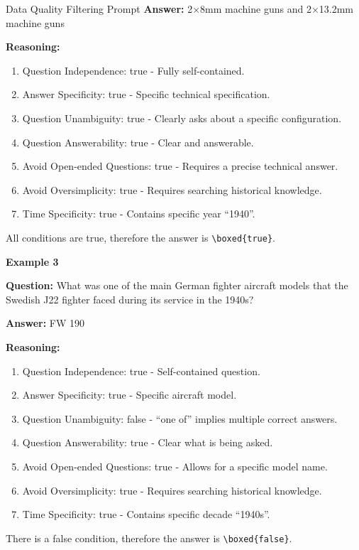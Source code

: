 \documentclass{article} %
\theoremstyle{plain}
\theoremstyle{definition}
\theoremstyle{remark}
\begin{document}
\begin{promptbox}{Data Quality Filtering Prompt}
\textbf{Answer:} 2$\times$8mm machine guns and 2$\times$13.2mm machine guns

\textbf{Reasoning:}
\begin{enumerate}[label=\arabic*.]
    \item Question Independence: true - Fully self-contained.
    \item Answer Specificity: true - Specific technical specification.
    \item Question Unambiguity: true - Clearly asks about a specific configuration.
    \item Question Answerability: true - Clear and answerable.
    \item Avoid Open-ended Questions: true - Requires a precise technical answer.
    \item Avoid Oversimplicity: true - Requires searching historical knowledge.
    \item Time Specificity: true - Contains specific year ``1940''.
\end{enumerate}
All conditions are true, therefore the answer is \texttt{\textbackslash boxed\{true\}}.

\noindent\hrulefill

\textbf{Example 3}

\textbf{Question:} What was one of the main German fighter aircraft models that the Swedish J22 fighter faced during its service in the 1940s?

\textbf{Answer:} FW 190

\textbf{Reasoning:}
\begin{enumerate}[label=\arabic*.]
    \item Question Independence: true - Self-contained question.
    \item Answer Specificity: true - Specific aircraft model.
    \item Question Unambiguity: false - ``one of'' implies multiple correct answers.
    \item Question Answerability: true - Clear what is being asked.
    \item Avoid Open-ended Questions: true - Allows for a specific model name.
    \item Avoid Oversimplicity: true - Requires searching historical knowledge.
    \item Time Specificity: true - Contains specific decade ``1940s''.
\end{enumerate}
There is a false condition, therefore the answer is \texttt{\textbackslash boxed\{false\}}.


\end{promptbox}
\end{document}
